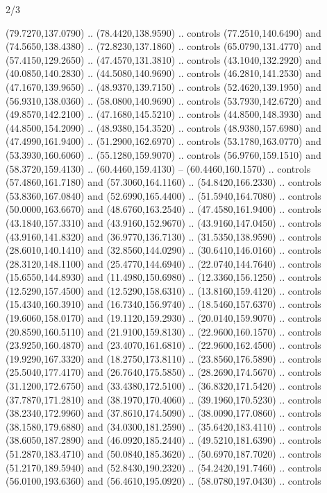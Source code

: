 \begin{flagdescription}{2/3}
\begin{scope}[shift={(0.5\flaglength,0.5)},scale=\flagwidth/480]
\begin{scope}[y=0.8pt, x=0.80pt, yscale=-1,shift={(-450,-300)}]
\begin{scope}[cm={{1.02948,0.0,0.0,1.02948,(-13.26599,6.99414)}}]
\begin{scope}[shift={(341.0917,90.34325)}]
  (79.7270,137.0790) .. (78.4420,138.9590) .. controls (77.2510,140.6490) and
  (74.5650,138.4380) .. (72.8230,137.1860) .. controls (65.0790,131.4770) and
  (57.4150,129.2650) .. (47.4570,131.3810) .. controls (43.1040,132.2920) and
  (40.0850,140.2830) .. (44.5080,140.9690) .. controls (46.2810,141.2530) and
  (47.1670,139.9650) .. (48.9370,139.7150) .. controls (52.4620,139.1950) and
  (56.9310,138.0360) .. (58.0800,140.9690) .. controls (53.7930,142.6720) and
  (49.8570,142.2100) .. (47.1680,145.5210) .. controls (44.8500,148.3930) and
  (44.8500,154.2090) .. (48.9380,154.3520) .. controls (48.9380,157.6980) and
  (47.4990,161.9400) .. (51.2900,162.6970) .. controls (53.1780,163.0770) and
  (53.3930,160.6060) .. (55.1280,159.9070) .. controls (56.9760,159.1510) and
  (58.3720,159.4130) .. (60.4460,159.4130) -- (60.4460,160.1570) .. controls
  (57.4860,161.7180) and (57.3060,164.1160) .. (54.8420,166.2330) .. controls
  (53.8360,167.0840) and (52.6990,165.4400) .. (51.5940,164.7080) .. controls
  (50.0000,163.6670) and (48.6760,163.2540) .. (47.4580,161.9400) .. controls
  (43.1840,157.3310) and (43.9160,152.9670) .. (43.9160,147.0450) .. controls
  (43.9160,141.8320) and (36.9770,136.7130) .. (31.5350,138.9590) .. controls
  (28.6010,140.1410) and (32.8560,144.0290) .. (30.6410,146.0160) .. controls
  (28.3120,148.1100) and (25.4770,144.6940) .. (22.0740,144.7640) .. controls
  (15.6550,144.8930) and (11.4980,150.6980) .. (12.3360,156.1250) .. controls
  (12.5290,157.4500) and (12.5290,158.6310) .. (13.8160,159.4120) .. controls
  (15.4340,160.3910) and (16.7340,156.9740) .. (18.5460,157.6370) .. controls
  (19.6060,158.0170) and (19.1120,159.2930) .. (20.0140,159.9070) .. controls
  (20.8590,160.5110) and (21.9100,159.8130) .. (22.9600,160.1570) .. controls
  (23.9250,160.4870) and (23.4070,161.6810) .. (22.9600,162.4500) .. controls
  (19.9290,167.3320) and (18.2750,173.8110) .. (23.8560,176.5890) .. controls
  (25.5040,177.4170) and (26.7640,175.5850) .. (28.2690,174.5670) .. controls
  (31.1200,172.6750) and (33.4380,172.5100) .. (36.8320,171.5420) .. controls
  (37.7870,171.2810) and (38.1970,170.4060) .. (39.1960,170.5230) .. controls
  (38.2340,172.9960) and (37.8610,174.5090) .. (38.0090,177.0860) .. controls
  (38.1580,179.6880) and (34.0300,181.2590) .. (35.6420,183.4110) .. controls
  (38.6050,187.2890) and (46.0920,185.2440) .. (49.5210,181.6390) .. controls
  (51.2870,183.4710) and (50.0840,185.3620) .. (50.6970,187.7020) .. controls
  (51.2170,189.5940) and (52.8430,190.2320) .. (54.2420,191.7460) .. controls
  (56.0100,193.6360) and (56.4610,195.0920) .. (58.0780,197.0430) .. controls

\end{scope}
\end{scope}
\end{scope}
\end{scope}
\end{flagdescription}
